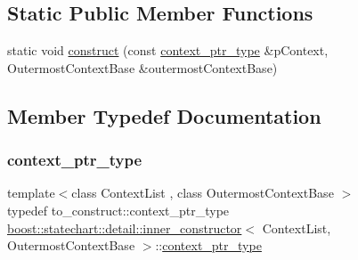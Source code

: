\subsection*{Static Public Member Functions}
\begin{DoxyCompactItemize}
\item 
static void \mbox{\hyperlink{structboost_1_1statechart_1_1detail_1_1inner__constructor_af354f3d57779d12f6f9f333105ac3578}{construct}} (const \mbox{\hyperlink{structboost_1_1statechart_1_1detail_1_1inner__constructor_ac79b48ef3b5aaf594f039305a9925aeb}{context\+\_\+ptr\+\_\+type}} \&p\+Context, Outermost\+Context\+Base \&outermost\+Context\+Base)
\end{DoxyCompactItemize}


\subsection{Member Typedef Documentation}
\mbox{\label{structboost_1_1statechart_1_1detail_1_1inner__constructor_ac79b48ef3b5aaf594f039305a9925aeb}} 
\subsubsection{\texorpdfstring{context\+\_\+ptr\+\_\+type}{context\_ptr\_type}}
{\footnotesize\ttfamily template$<$class Context\+List , class Outermost\+Context\+Base $>$ \\
typedef to\+\_\+construct\+::context\+\_\+ptr\+\_\+type \mbox{\hyperlink{structboost_1_1statechart_1_1detail_1_1inner__constructor}{boost\+::statechart\+::detail\+::inner\+\_\+constructor}}$<$ Context\+List, Outermost\+Context\+Base $>$\+::\mbox{\hyperlink{structboost_1_1statechart_1_1detail_1_1inner__constructor_ac79b48ef3b5aaf594f039305a9925aeb}{context\+\_\+ptr\+\_\+type}}}

\mbox{\label{structboost_1_1statechart_1_1detail_1_1inner__constructor_a66070519599355beff83fce685019f14}} 
